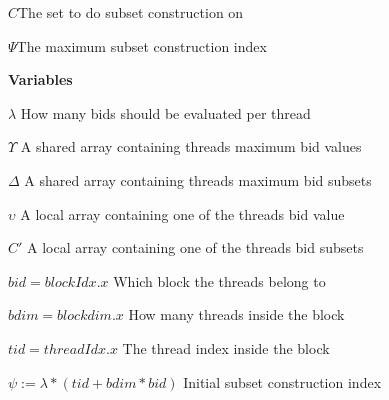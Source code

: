\documentclass[a4paper, 12pt]{report}
\begin{document}
$C$\hfill The set to do subset construction on

$\Psi$\hfill The maximum subset construction index


\textbf{Variables} 

$\lambda$ \hfill How many bids should be evaluated per thread

$\Upsilon$ \hfill A shared array containing threads maximum bid values

$\Delta$ \hfill A shared array containing threads maximum bid subsets

$\upsilon$ \hfill A local array containing one of the threads bid value

$C'$ \hfill A local array containing one of the threads bid subsets

$bid = blockIdx.x$ \hfill Which block the threads belong to

$bdim = blockdim.x$ \hfill How many threads inside the block

$tid = threadIdx.x$ \hfill The thread index inside the block

$\psi := \lambda*(tid+bdim*bid)$ \hfill Initial subset construction index
\end{document}
